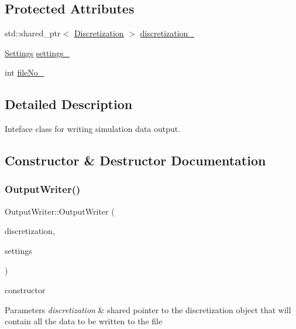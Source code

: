 \subsection*{Protected Attributes}
\begin{DoxyCompactItemize}
\item 
std\+::shared\+\_\+ptr$<$ \mbox{\hyperlink{classDiscretization}{Discretization}} $>$ \mbox{\hyperlink{classOutputWriter_a0587b2dc160a9b1393411433dfc23b68}{discretization\+\_\+}}
\item 
\mbox{\hyperlink{structSettings}{Settings}} \mbox{\hyperlink{classOutputWriter_a71372511003897a3c29d0e80cfbb12be}{settings\+\_\+}}
\item 
int \mbox{\hyperlink{classOutputWriter_a69d167e2526407602dce26ca7a2b9248}{file\+No\+\_\+}}
\end{DoxyCompactItemize}


\subsection{Detailed Description}
Inteface class for writing simulation data output. 

\subsection{Constructor \& Destructor Documentation}
\mbox{\label{classOutputWriter_a07a48bbf23f44147dce2ea3548f1d8e0}} 
\subsubsection{\texorpdfstring{OutputWriter()}{OutputWriter()}}
{\footnotesize\ttfamily Output\+Writer\+::\+Output\+Writer (\begin{DoxyParamCaption}\item[{shared\+\_\+ptr$<$ \mbox{\hyperlink{classDiscretization}{Discretization}} $>$}]{discretization,  }\item[{\mbox{\hyperlink{structSettings}{Settings}}}]{settings }\end{DoxyParamCaption})}

constructor 
\begin{DoxyParams}{Parameters}
{\em discretization} & shared pointer to the discretization object that will contain all the data to be written to the file \\
\hline
\end{DoxyParams}


